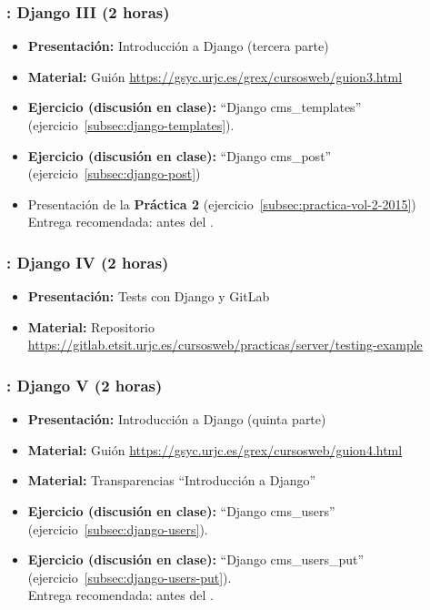 \documentclass[a4paper,12pt]{article}
\begin{document}
\subsubsection{\juevesI: Django III (2 horas)}
\label{cal:juevesI}

\begin{itemize}
 \item \textbf{Presentación:} Introducción a Django (tercera parte)
  \item \textbf{Material:} Guión \url{https://gsyc.urjc.es/grex/cursosweb/guion3.html}
 \item \textbf{Ejercicio (discusión en clase):} ``Django cms\_templates'' (ejercicio~\ref{subsec:django-templates}).
 \item \textbf{Ejercicio (discusión en clase):} ``Django cms\_post'' (ejercicio~\ref{subsec:django-post}) \\
  \item Presentación de la \textbf{Práctica 2} (ejercicio~\ref{subsec:practica-vol-2-2015}) \\
  Entrega recomendada: antes del \juevesK.
\end{itemize}

\subsubsection{\juevesJ: Django IV (2 horas)}
\label{cal:juevesJ}

\begin{itemize}
 \item \textbf{Presentación:} Tests con Django y GitLab
  \item \textbf{Material:} Repositorio \url{https://gitlab.etsit.urjc.es/cursosweb/practicas/server/testing-example}
\end{itemize}


\subsubsection{\juevesK: Django V (2 horas)}
\label{cal:juevesK}

\begin{itemize}
 \item \textbf{Presentación:} Introducción a Django (quinta parte)
 \item \textbf{Material:} Guión \url{https://gsyc.urjc.es/grex/cursosweb/guion4.html}
 \item \textbf{Material:} Transparencias ``Introducción a Django''
 \item \textbf{Ejercicio (discusión en clase):} ``Django cms\_users'' (ejercicio~\ref{subsec:django-users}).
 \item \textbf{Ejercicio (discusión en clase):} ``Django cms\_users\_put'' (ejercicio~\ref{subsec:django-users-put}). \\
  Entrega recomendada: antes del \juevesL.
\end{itemize}
\end{document}
